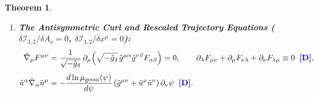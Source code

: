 \documentclass[11pt,a4paper]{article}
\newcommand{\catD}{\text{\textbf{\textcolor{blue!75!black}{[D]}}}}
\theoremstyle{definition}
\theoremstyle{plain}
\newtheorem{theorem}[axiom]{Theorem}
\theoremstyle{remark}
\begin{document}
\begin{theorem}
\begin{enumerate}[label=(\roman*)]
  For any general differentiable potential $\mathcal{V}_{\mathrm{spec}}(\psi, \mathcal{A}) \equiv V_{\mathrm{gen}}(e^\psi, \mathcal{A})$, diffeomorphism invariance of $\int d^4x\sqrt{-\tilde{g}_4}\,\mathcal{V}_{\mathrm{spec}}(\psi, \mathcal{A})$ and torsion-freeness $\tilde{\nabla}_\mu\partial_\nu\Theta^{(1)} = \tilde{\nabla}_\nu\partial_\mu\Theta^{(1)}$ imply that the covariant divergence of the mixed scalar-plus-potential stress tensor on any bivariate $(t_1, r)$-dependent background satisfies the exact off-shell Noether identity $\tilde{\nabla}_\mu\!\left[\tilde{T}^\mu_{\;\nu(\psi)} + \tilde{T}^\mu_{\;\nu(\mathcal{V})}\right] \equiv \frac{3}{2}\,\mathcal{E}_\psi\,\partial_\nu\psi + 2\,\mathcal{E}_\Theta\,\partial_\nu\Theta^{(1)}$ (where $\mathcal{E}_\psi \equiv \tilde{\Delta}_4\psi - \frac{2}{3}(\partial_\psi\mathcal{V}_{\mathrm{spec}} - \mathcal{A}\partial_{\mathcal{A}}\mathcal{V}_{\mathrm{spec}})$, \texttt{COR~\#081}); hence Eq.~\eqref{eq:c3_khronon_conservation_eq} is implied automatically by $\tilde{\nabla}_\mu\tilde{G}^{(4)\mu}_{\;\nu} \equiv 0$ \catD.
  \item \textbf{The Antisymmetric Curl and Rescaled Trajectory Equations ($\delta\mathcal{I}_{3,2}/\delta A_\nu = 0$, $\delta\mathcal{I}_{3,2}/\delta x^\mu = 0$):}
  \begin{align}
  \tilde{\nabla}_\mu F^{\mu\nu} &= \frac{1}{\sqrt{-\tilde{g}_4}}\,\partial_\mu\!\left(\sqrt{-\tilde{g}_4}\,\tilde{g}^{\mu\alpha}\tilde{g}^{\nu\beta}F_{\alpha\beta}\right) = 0, \qquad
  \partial_\lambda F_{\mu\nu} + \partial_\mu F_{\nu\lambda} + \partial_\nu F_{\lambda\mu} \equiv 0 \;\;\catD, \label{eq:c3_master_maxwell_eq} \\[4pt]
  \tilde{u}^\alpha\tilde{\nabla}_\alpha\tilde{u}^\mu &= -\frac{d\ln\mu_{\mathrm{geom}}(\psi)}{d\psi}\left(\tilde{g}^{\mu\nu} + \tilde{u}^\mu\tilde{u}^\nu\right)\partial_\nu\psi \;\;\catD. \label{eq:c3_master_trajectory_eq}
  \end{align}
\end{enumerate}
\end{theorem}
\end{document}
